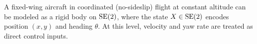\documentclass[../AAE590LGM_HW3.tex]{subfiles}
\begin{document}
A fixed-wing aircraft in coordinated (no-sideslip) flight at constant altitude can be modeled as a rigid body on $\text{SE}(2)$, where the state $X \in \text{SE}(2)$ encodes position $(x, y)$ and heading $\theta$. At this level, velocity and yaw rate are treated as direct control inputs.
\end{document}
